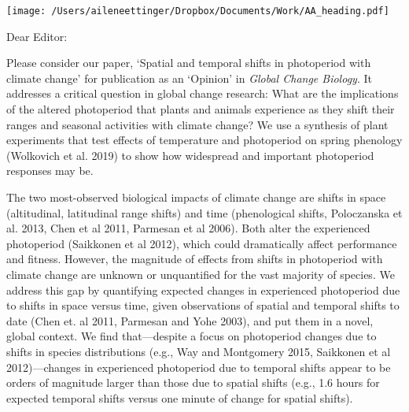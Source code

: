 \documentclass[10.7pt,a4paper]{letter} %
\begin{document}

\begin{letter}{}
\texttt{[image: /Users/aileneettinger/Dropbox/Documents/Work/AA\_heading.pdf]}

\opening{Dear Editor:}
Please consider our paper, `Spatial and temporal shifts in photoperiod with climate change' for publication as an `Opinion' in \emph{Global Change Biology}. It addresses a critical question in global change research: What are the implications of the altered photoperiod that plants and animals experience as they shift their ranges and seasonal activities with climate change? We use a synthesis of plant experiments that test effects of temperature and photoperiod on spring phenology (Wolkovich et al. 2019) to show how widespread and important photoperiod responses may be.

The two most-observed biological impacts of climate change are shifts in space (altitudinal, latitudinal range shifts) and time (phenological shifts, Poloczanska et al. 2013, Chen et al 2011, Parmesan et al 2006). Both alter the experienced photoperiod (Saikkonen et al 2012), which could dramatically affect performance and fitness. However, the magnitude of effects from shifts in photoperiod with climate change are unknown or unquantified for the vast majority of species.  We address this gap by quantifying expected changes in experienced photoperiod due to shifts in space versus time, given observations of spatial and temporal shifts to date (Chen et. al 2011, Parmesan and Yohe 2003), and put them in a novel, global context. We find that---despite a focus on photoperiod changes due to shifts in species distributions (e.g., Way and Montgomery 2015, Saikkonen et al 2012)---changes in experienced photoperiod due to temporal shifts appear to be orders of magnitude larger than those due to spatial shifts (e.g., 1.6 hours for expected temporal shifts versus one minute of change for spatial shifts). 


\end{letter}
\end{document}
